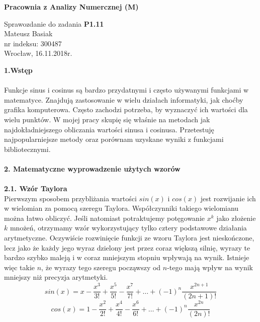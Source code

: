 \documentclass[a4paper]{article}
\begin{document}
\begin{center}
\LARGE
\textbf{Pracownia z Analizy Numercznej (M)}\\
\end{center}
\begin{center}
\Large
Sprawozdanie do zadania \textbf{P1.11}\\
Mateusz Basiak\\
nr indeksu: 300487\\
Wrocław, 16.11.2018r.\\
\end{center}
\Large
\textbf{1.Wstęp}\\\\
\normalsize
Funkcje sinus i cosinus są bardzo przydatnymi i często używanymi funkcjami w matematyce. Znajdują zastosowanie w wielu działach informatyki, jak choćby grafika komputerowa. Często zachodzi potrzeba, by wyznaczyć ich wartości dla wielu punktów. W mojej pracy skupię się właśnie na metodach jak najdokładniejszego obliczania wartości sinusa i cosinusa. Przetestuję najpopularniejsze metody oraz porównam uzyskane wyniki z funkcjami bibliotecznymi. \\\\
\Large
\textbf{2. Matematyczne wyprowadzenie użytych wzorów}\\\\
\large
\textbf{2.1. Wzór Taylora}\\
\normalsize
Pierwszym sposobem przybliżania wartości $sin(x)$ i $cos(x)$ jest rozwijanie ich w wielomian za pomocą szeregu Taylora.\cite{MP} Współczynniki takiego wielomianu można łatwo obliczyć. Jeśli natomiast potraktujemy potęgowanie $x^k$ jako złożenie $k$ mnożeń, otrzymamy wzór wykorzystujący tylko cztery podstawowe działania arytmetyczne. Oczywiście rozwinięcie funkcji ze wzoru Taylora jest nieskończone, lecz jako że każdy jego wyraz dzielony jest przez coraz większą silnię, wyrazy te bardzo szybko maleją i w coraz mniejszym stopniu wpływają na wynik. Istnieje więc takie $n$, że wyrazy tego szeregu począwszy od $n$-tego mają wpływ na wynik mniejszy niż precyzja arytmetyki.
\begin{equation}\label{sinTaylor1}
sin(x) = x - \frac{x^3}{3!} + \frac{x^5}{5!} - \frac{x^7}{7!} + \dots + (-1)^n\frac{x^{2n+1}}{(2n+1)!}
\end{equation}
\begin{equation}\label{cosTaylor1}
cos(x) = 1 - \frac{x^2}{2!} + \frac{x^4}{4!} - \frac{x^6}{6!} + \dots + (-1)^n\frac{x^{2n}}{(2n)!}
\end{equation}\\
\end{document}
